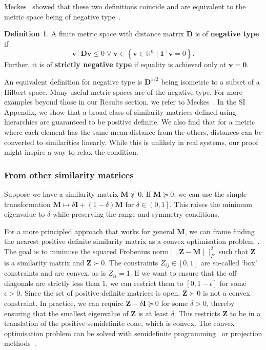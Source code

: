 \documentclass[aps,pre,floats,floatfix,superscriptaddress,twocolumn,final,10pt]{revtex4-2}
\theoremstyle{definition}
\newtheorem{definition}{Definition}
\renewcommand{\vec}[1]{\mathbf{#1}}
\begin{document}
Meckes~\cite[Theorem 3.3]{Meckes2013} showed that these two definitions coincide and are equivalent to the metric space being of negative type~\cite{Schoenberg1938}.
\begin{definition}
    A finite metric space with distance matrix $\vec{D}$ is of \textbf{negative type} if
    \begin{equation}
        \vec{v}^\top \vec{Dv} \leq 0 \; \forall \; \vec{v} \in \left\{ \vec{v} \in \mathbb{R}^n \mid \vec{1}^\top\vec{v}=0 \right\}.
    \end{equation}
    Further, it is of \textbf{strictly negative type} if equality is achieved only at $\vec{v}=\vec{0}$.
\label{def:negative_type}
\end{definition}
An equivalent definition for negative type is $\vec{D}^{1/2}$ being isometric to a subset of a Hilbert space. Many useful metric spaces are of the negative type. For more examples beyond those in our Results section, we refer to Meckes~\cite[Theorem 3.6]{Meckes2013}. In the SI Appendix, we show that a broad class of similarity matrices defined using hierarchies are guaranteed to be positive definite. We also find that for a metric where each element has the same mean distance from the others, distances can be converted to similarities linearly. While this is unlikely in real systems, our proof might inspire a way to relax the condition.

\subsubsection{From other similarity matrices}

Suppose we have a similarity matrix $\vec{M} \not\succ 0$. If $\vec{M}\succeq0$, we can use the simple transformation $\vec{M}\mapsto \delta\vec{I}+(1-\delta)\vec{M}$ for $\delta\in\left(0,1\right]$. This raises the minimum eigenvalue to $\delta$ while preserving the range and symmetry conditions.

For a more principled approach that works for general $\vec{M}$, we can frame finding the nearest positive definite similarity matrix as a convex optimisation problem~\cite{Boyd2004}. The goal is to minimise the squared Frobenius norm $\mid\mid \vec{Z} - \vec{M}\mid\mid^2_F$ such that $\vec{Z}$ is a similarity matrix and $\vec{Z}\succ0$. The constraints $Z_{ij} \in [0,1]$ are so-called `box' constraints and are convex, as is $Z_{ii}=1$. If we want to ensure that the off-diagonals are strictly less than 1, we can restrict them to $[0,1-\epsilon]$ for some $\epsilon>0$. Since the set of positive definite matrices is open, $\vec{Z} \succ 0$ is not a convex constraint. In practice, we can require $\vec{Z}-\delta\vec{I} \succeq 0$ for some $\delta>0$, thereby ensuring that the smallest eigenvalue of $\vec{Z}$ is at least $\delta$. This restricts $\vec{Z}$ to be in a translation of the positive semidefinite cone, which is convex. The convex optimisation problem can be solved with semidefinite programming~\cite{Vandenberghe1996} or projection methods~\cite{Boyle1986}.
\end{document}
